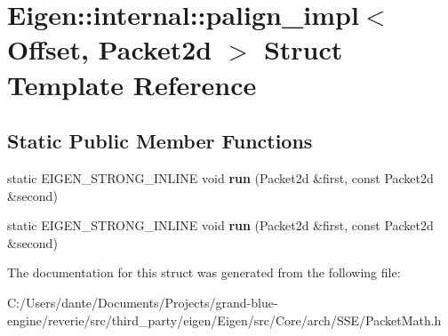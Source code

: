 \hypertarget{struct_eigen_1_1internal_1_1palign__impl_3_01_offset_00_01_packet2d_01_4}{}\section{Eigen\+::internal\+::palign\+\_\+impl$<$ Offset, Packet2d $>$ Struct Template Reference}
\label{struct_eigen_1_1internal_1_1palign__impl_3_01_offset_00_01_packet2d_01_4}
\subsection*{Static Public Member Functions}
\begin{DoxyCompactItemize}
\item 
\mbox{\label{struct_eigen_1_1internal_1_1palign__impl_3_01_offset_00_01_packet2d_01_4_a67e74f2cd50ad7d14d1820186da5f752}} 
static E\+I\+G\+E\+N\+\_\+\+S\+T\+R\+O\+N\+G\+\_\+\+I\+N\+L\+I\+NE void {\bfseries run} (Packet2d \&first, const Packet2d \&second)
\item 
\mbox{\label{struct_eigen_1_1internal_1_1palign__impl_3_01_offset_00_01_packet2d_01_4_a67e74f2cd50ad7d14d1820186da5f752}} 
static E\+I\+G\+E\+N\+\_\+\+S\+T\+R\+O\+N\+G\+\_\+\+I\+N\+L\+I\+NE void {\bfseries run} (Packet2d \&first, const Packet2d \&second)
\end{DoxyCompactItemize}


The documentation for this struct was generated from the following file\+:\begin{DoxyCompactItemize}
\item 
C\+:/\+Users/dante/\+Documents/\+Projects/grand-\/blue-\/engine/reverie/src/third\+\_\+party/eigen/\+Eigen/src/\+Core/arch/\+S\+S\+E/Packet\+Math.\+h\end{DoxyCompactItemize}
